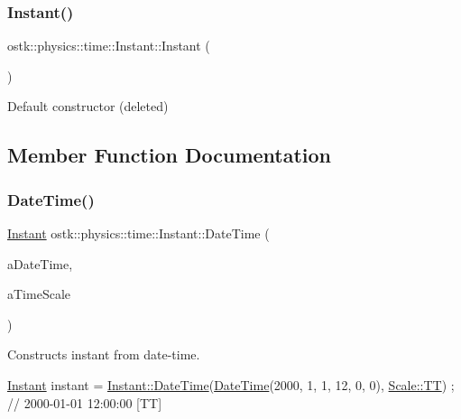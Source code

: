 \subsubsection{\texorpdfstring{Instant()}{Instant()}}
{\footnotesize\ttfamily ostk\+::physics\+::time\+::\+Instant\+::\+Instant (\begin{DoxyParamCaption}{ }\end{DoxyParamCaption})\hspace{0.3cm}{\ttfamily [delete]}}



Default constructor (deleted) 



\subsection{Member Function Documentation}
\mbox{\label{classostk_1_1physics_1_1time_1_1_instant_afd5725574a02389b80fad4baff313c8a}} 
\subsubsection{\texorpdfstring{Date\+Time()}{DateTime()}}
{\footnotesize\ttfamily \hyperlink{classostk_1_1physics_1_1time_1_1_instant}{Instant} ostk\+::physics\+::time\+::\+Instant\+::\+Date\+Time (\begin{DoxyParamCaption}\item[{const \hyperlink{classostk_1_1physics_1_1time_1_1_date_time}{time\+::\+Date\+Time} \&}]{a\+Date\+Time,  }\item[{const \hyperlink{namespaceostk_1_1physics_1_1time_adf23d37bd8641fb76a0e98ab46a70df7}{Scale} \&}]{a\+Time\+Scale }\end{DoxyParamCaption})\hspace{0.3cm}{\ttfamily [static]}}



Constructs instant from date-\/time. 


\begin{DoxyCode}
\hyperlink{classostk_1_1physics_1_1time_1_1_instant_a132c1e4b2fe9a9a671109206e297bd5d}{Instant} instant = \hyperlink{classostk_1_1physics_1_1time_1_1_instant_afd5725574a02389b80fad4baff313c8a}{Instant::DateTime}(\hyperlink{classostk_1_1physics_1_1time_1_1_instant_afd5725574a02389b80fad4baff313c8a}{DateTime}(2000, 1, 1, 12, 0, 0), 
      \hyperlink{namespaceostk_1_1physics_1_1time_adf23d37bd8641fb76a0e98ab46a70df7adf1f3edb9115acb0a1e04209b7a9937b}{Scale::TT}) ; \textcolor{comment}{// 2000-01-01 12:00:00 [TT]}
\end{DoxyCode}


